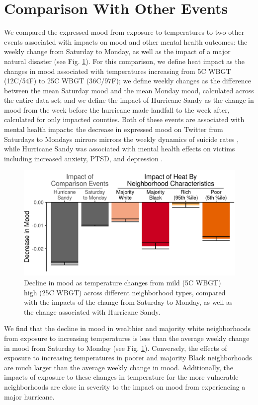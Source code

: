 \documentclass[fleqn,10pt]{wlscirep}
\begin{document}
\section*{Comparison With Other Events}
We compared the expressed mood from exposure to temperatures to two other events associated with impacts on mood and other mental health outcomes: the weekly change from Saturday to Monday, as well as the impact of a major natural disaster (see Fig. \ref{fig:compare}). For this comparison, we define heat impact as the changes in mood associated with temperatures increasing from 5\textdegree C WBGT (12\textdegree C/54\textdegree F) to 25\textdegree C WBGT (36\textdegree C/97\textdegree F); we define weekly changes as the difference between the mean Saturday mood and the mean Monday mood, calculated across the entire data set; and we define the impact of Hurricane Sandy as the change in mood from the week before the hurricane made landfall to the week after, calculated for only impacted counties. Both of these events are associated with mental health impacts: the decrease in expressed mood on Twitter from Saturdays to Mondays mirrors mirrors the weekly dynamics of suicide rates \cite{CDC2021}, while Hurricane Sandy was associated with mental health effects on victims including increased anxiety, PTSD, and depression \cite{Schwartz2017Aug, Lieberman-Cribbin2017}.

\begin{figure}[H]
 \centering
 \includegraphics[width=0.66\linewidth]{../res/comparison_plot.png}
 \caption{Decline in mood as temperature changes from mild (5\textdegree C WBGT) high (25\textdegree C WBGT) across different neighborhood types, compared with the impacts of the change from Saturday to Monday, as well as the change associated with Hurricane Sandy.}
 \label{fig:compare}
\end{figure}

We find that the decline in mood in wealthier and majority white neighborhoods from exposure to increasing temperatures is less than the average weekly change in mood from Saturday to Monday (see Fig. \ref{fig:compare}). Conversely, the effects of exposure to increasing temperatures in poorer and majority Black neighborhoods are much larger than the average weekly change in mood. Additionally, the impacts of exposure to these changes in temperature for the more vulnerable neighborhoods are close in severity to the impact on mood from experiencing a major hurricane.
\end{document}
